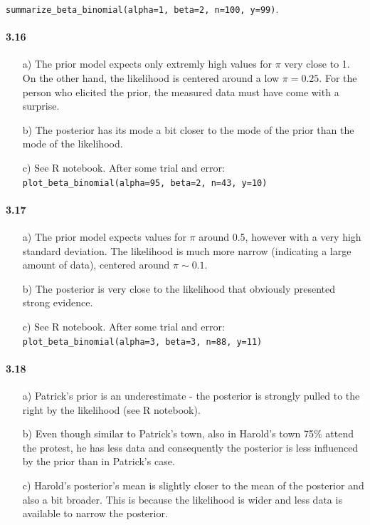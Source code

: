 \documentclass[fontsize=11pt,DIV=18,parskip=half]{scrartcl}
\begin{document}
\begin{center}
	\texttt{summarize\_beta\_binomial(alpha=1, beta=2, n=100, y=99)}.
\end{center}

\paragraph{3.16}
\begin{enumerate}
\item[a)] The prior model expects only extremly high values for $\pi$ very close to 1. On the other hand, the likelihood is centered around a low $\pi=0.25$. For the person who elicited the prior, the measured data must have come with a surprise.
\item[b)] The posterior has its mode a bit closer to the mode of the prior than the mode of the likelihood.
\item[c)] See R notebook. After some trial and error: \texttt{plot\_beta\_binomial(alpha=95, beta=2, n=43, y=10)}
\end{enumerate}

\paragraph{3.17}
\begin{enumerate}
\item[a)] The prior model expects values for $\pi$ around 0.5, however with a very high standard deviation. The likelihood is much more narrow (indicating a large amount of data), centered around $\pi\sim0.1$.
\item[b)] The posterior is very close to the likelihood that obviously presented strong evidence.
\item[c)] See R notebook. After some trial and error: \texttt{plot\_beta\_binomial(alpha=3, beta=3, n=88, y=11)}
\end{enumerate}

\paragraph{3.18}
\begin{enumerate}
\item[a)] Patrick's prior is an underestimate - the posterior is strongly pulled to the right by the likelihood (see R notebook).
\item[b)] Even though similar to Patrick's town, also in Harold's town 75\% attend the protest, he has less data and consequently the posterior is less influenced by the prior than in Patrick's case.
\item[c)] Harold's posterior's mean is slightly closer to the mean of the posterior and also a bit broader. This is because the likelihood is wider and less data is available to narrow the posterior.
\end{enumerate}
\end{document}
